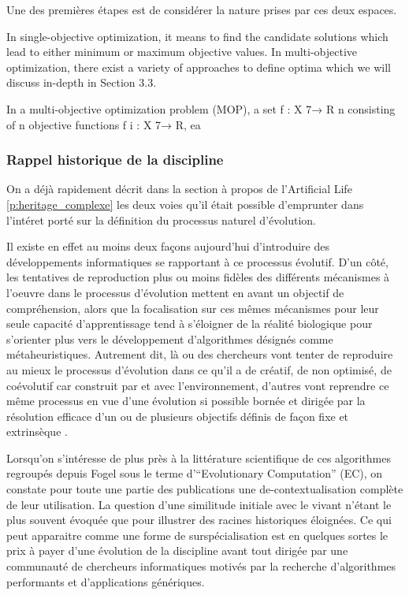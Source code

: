 Une des premières étapes est de considérer la nature prises par ces deux espaces.

In single-objective optimization, it means to find the candidate solutions which lead to either minimum or maximum objective values. In multi-objective optimization, there exist a variety of approaches to define optima which we will discuss in-depth in Section 3.3.

In a multi-objective optimization problem (MOP), a set f : X 7→ R n consisting of n objective functions f i : X 7→ R, ea

\subsubsection{Rappel historique de la discipline}

On a déjà rapidement décrit dans la section à propos de l'Artificial Life \ref{p:heritage_complexe} les deux voies qu'il était possible d'emprunter dans l'intéret porté sur la définition du processus naturel d'évolution. 

Il existe en effet au moins deux façons aujourd'hui d'introduire des développements informatiques se rapportant à ce processus évolutif. D'un côté, les tentatives de reproduction plus ou moins fidèles des différents mécanismes à l'oeuvre dans le processus d'évolution mettent en avant un objectif de compréhension, alors que la focalisation sur ces mêmes mécanismes pour leur seule capacité d'apprentissage tend à s'éloigner de la réalité biologique pour s'orienter plus vers le développement d'algorithmes désignés comme métaheuristiques. Autrement dit, là ou des chercheurs vont tenter de reproduire au mieux le processus d'évolution dans ce qu'il a de créatif, de non optimisé, de coévolutif car construit par  et avec l'environnement, d'autres vont reprendre ce même processus en vue d'une évolution si possible bornée et dirigée par la résolution efficace d'un ou de plusieurs objectifs définis de façon fixe et extrinsèque \autocites{Taylor2001, Taylor2012}.

Lorsqu'on s'intéresse de plus près à la littérature scientifique de ces algorithmes regroupés depuis Fogel sous le terme d'\foreignquote{english}{Evolutionary Computation} (EC), on constate pour toute une partie des publications une de-contextualisation complète de leur utilisation. La question d'une similitude initiale avec le vivant n'étant le plus souvent évoquée que pour illustrer des racines historiques éloignées. Ce qui peut apparaitre comme une forme de surspécialisation est en quelques sortes le prix à payer d'une évolution de la discipline avant tout dirigée par une communauté de chercheurs informatiques motivés par la recherche d'algorithmes performants et d'applications génériques.

